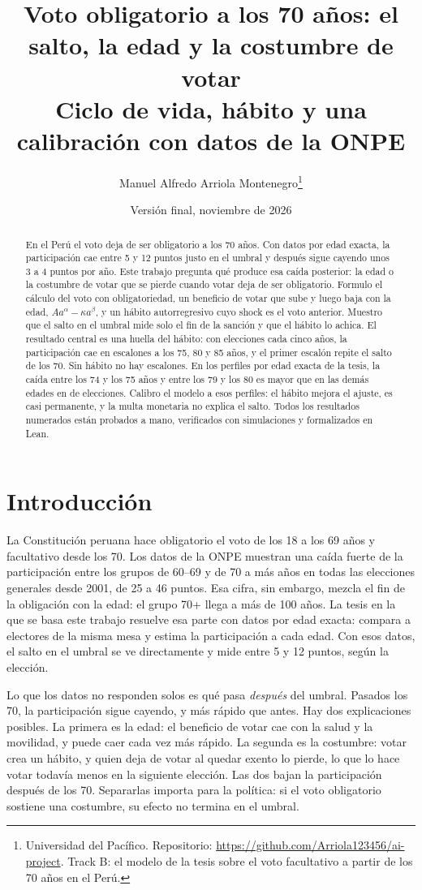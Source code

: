 \documentclass[11pt]{article}
\title{Voto obligatorio a los 70 años: el salto, la edad y la costumbre de votar\\
\large Ciclo de vida, hábito y una calibración con datos de la ONPE}
\author{Manuel Alfredo Arriola Montenegro\thanks{Universidad del Pac\'ifico. Repositorio:
  \url{https://github.com/Arriola123456/ai-project}. Track B: el modelo de la tesis sobre el
  voto facultativo a partir de los 70 años en el Perú.}}
\date{Versión final, noviembre de 2026}
\theoremstyle{definition}
\newcommand{\1}{\mathbbm{1}}
\begin{document}
\maketitle

\begin{abstract}
\noindent En el Perú el voto deja de ser obligatorio a los 70 años. Con datos por edad exacta, la
participación cae entre 5 y 12 puntos justo en el umbral y después sigue cayendo unos 3 a 4 puntos
por año. Este trabajo pregunta qué produce esa caída posterior: la edad o la costumbre de votar que
se pierde cuando votar deja de ser obligatorio. Formulo el cálculo del voto con obligatoriedad, un
beneficio de votar que sube y luego baja con la edad, $Aa^{\alpha}-\kappa a^{\beta}$, y un hábito
autorregresivo cuyo shock es el voto anterior. Muestro que el salto en el umbral mide solo el fin de
la sanción y que el hábito lo achica. El resultado central es una huella del hábito: con elecciones
cada cinco años, la participación cae en escalones a los 75, 80 y 85 años, y el primer escalón
repite el salto de los 70. Sin hábito no hay escalones. En los perfiles por edad exacta de la tesis,
la caída entre los 74 y los 75 años y entre los 79 y los 80 es mayor que en las demás edades en
\stepsN{} de \stepsElections{} elecciones. Calibro el modelo a esos perfiles: el hábito mejora el
ajuste, es casi permanente, y la multa monetaria no explica el salto. Todos los resultados
numerados están probados a mano, verificados con simulaciones y formalizados en Lean.
\end{abstract}

\section{Introducción}\label{sec:intro}

La Constitución peruana hace obligatorio el voto de los 18 a los 69 años y facultativo desde los 70.
Los datos de la ONPE muestran una caída fuerte de la participación entre los grupos de 60--69 y de
70 a más años en todas las elecciones generales desde 2001, de 25 a 46 puntos. Esa cifra, sin
embargo, mezcla el fin de la obligación con la edad: el grupo 70+ llega a más de 100 años. La tesis
en la que se basa este trabajo resuelve esa parte con datos por edad exacta: compara a electores de
la misma mesa y estima la participación a cada edad. Con esos datos, el salto en el umbral se ve
directamente y mide entre 5 y 12 puntos, según la elección.

Lo que los datos no responden solos es qué pasa \emph{después} del umbral. Pasados los 70, la
participación sigue cayendo, y más rápido que antes. Hay dos explicaciones posibles. La primera es la
edad: el beneficio de votar cae con la salud y la movilidad, y puede caer cada vez más rápido. La
segunda es la costumbre: votar crea un hábito, y quien deja de votar al quedar exento lo pierde, lo
que lo hace votar todavía menos en la siguiente elección. Las dos bajan la participación después de
los 70. Separarlas importa para la política: si el voto obligatorio sostiene una costumbre, su efecto
no termina en el umbral.
\end{document}
